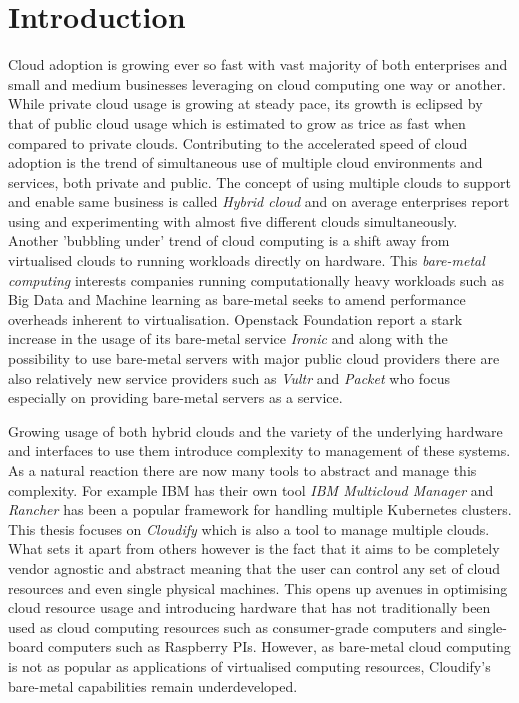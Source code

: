 \section{Introduction}

Cloud adoption is growing ever so fast with vast majority of both enterprises and small and medium businesses leveraging on cloud computing one way or another. \cite{stateofthecloud} While private cloud usage is growing at steady pace, its growth is eclipsed by that of public cloud usage which is estimated to grow as trice as fast when compared to private clouds. 
Contributing to the accelerated speed of cloud adoption is the trend of simultaneous use of multiple cloud environments and services, both private and public. The concept of using multiple clouds to support and enable same business is called \textit{Hybrid cloud} and on average enterprises report using and experimenting with almost five different clouds simultaneously. 
Another 'bubbling under' trend of cloud computing is a shift away from virtualised clouds to running workloads directly on hardware. This \textit  {bare-metal computing} interests companies running computationally heavy workloads such as Big Data and Machine learning as bare-metal seeks to amend performance overheads inherent to virtualisation. Openstack Foundation report a stark increase in the usage of its bare-metal service \textit{Ironic} \cite{openstacksurvey} and along with the possibility to use bare-metal servers with major public cloud providers there are also relatively new service providers such as \textit{Vultr}\cite{vultr} and \textit{Packet}\cite{packet} who focus especially on providing bare-metal servers as a service.

Growing usage of both hybrid clouds and the variety of the underlying hardware and interfaces to use them introduce complexity to management of these systems. As a natural reaction there are now many tools to abstract and manage this complexity. For example IBM has their own tool \textit{IBM Multicloud Manager}\cite{ibmmulticloud} and \textit{Rancher} has been a popular framework for handling multiple Kubernetes clusters\cite{Kubernetes}. This thesis focuses on \textit{Cloudify}\cite{cloudify} which is also a tool to manage multiple clouds. What sets it apart from others however is the fact that it aims to be completely vendor agnostic and abstract meaning that the user can control any set of cloud resources and even single physical machines. This opens up avenues in optimising cloud resource usage and introducing hardware that has not traditionally been used as cloud computing resources such as consumer-grade computers and single-board computers such as Raspberry PIs. However, as bare-metal cloud computing is not as popular as applications of virtualised computing resources, Cloudify's bare-metal capabilities remain underdeveloped.

